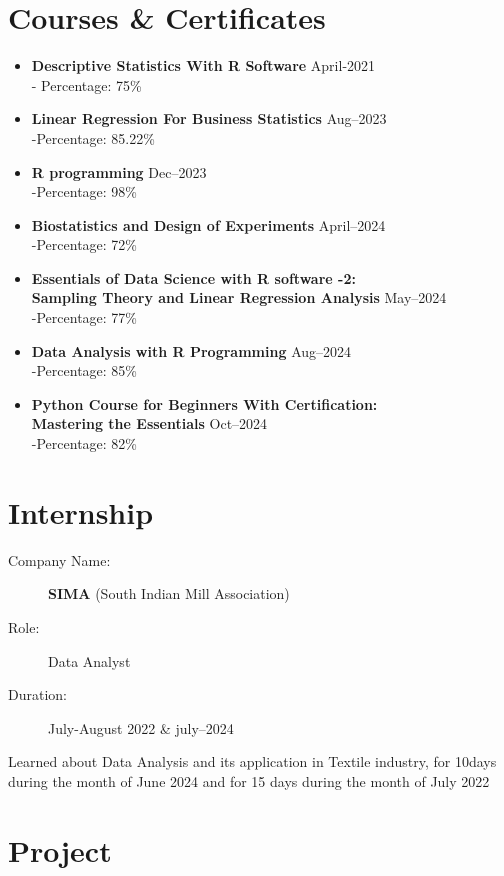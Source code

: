 \documentclass[a4paper,11pt]{article}
\begin{document}
	\section*{Courses \& Certificates}
	\noindent
	\begin{itemize}
		\item \textbf{Descriptive Statistics With R Software } \hfill April-2021\\
		- Percentage: 75\%
		\item \textbf{Linear Regression For Business Statistics} \hfill Aug--2023\\
		-Percentage: 85.22\%
		\item \textbf{R programming } \hfill Dec--2023\\
		-Percentage: 98\%
		\item \textbf{Biostatistics and Design of Experiments} \hfill April--2024 \\
		-Percentage: 72\%
		\item \textbf{Essentials of Data Science with R software -2:\\
			Sampling Theory and Linear Regression Analysis} \hfill May--2024 \\
		-Percentage: 77\%
		\item \textbf{Data Analysis with R Programming} \hfill Aug--2024 \\
		-Percentage: 85\%
		\item \textbf{Python Course for Beginners With Certification:\\ Mastering the Essentials} \hfill Oct--2024 \\
		-Percentage: 82\%
		
	\end{itemize}
	
	
	\section*{Internship}
	\begin{description}
		\item[Company Name:] \textbf{SIMA} (South Indian Mill Association)
		\item[Role:] Data Analyst
		\item[Duration:] July-August 2022 \& july--2024
	\end{description}
	Learned about Data Analysis and its application in Textile industry, for 10days during 
	the month of June 2024 and for 15 days during the month of July 2022
	\newpage
	\section*{Project}
	
\end{document}

